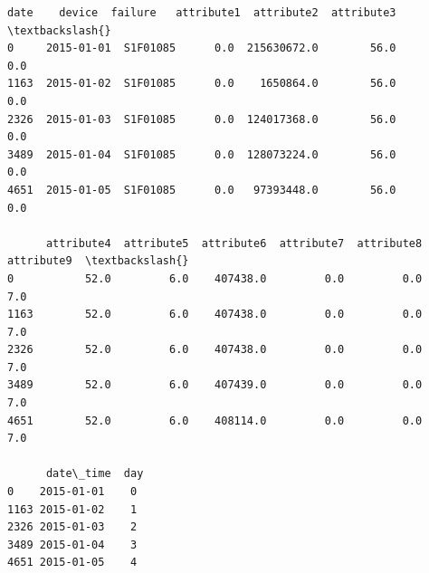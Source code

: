 \documentclass[11pt]{article}
\makeatletter
\newcommand{\boxspacing}{\kern\kvtcb@left@rule\kern\kvtcb@boxsep}
\newcommand{\prompt}[4]{
        \ttfamily\llap{{\color{#2}[#3]:\hspace{3pt}#4}}\vspace{-\baselineskip}
    }
\makeatother
\begin{document}
            \begin{tcolorbox}[breakable, size=fbox, boxrule=.5pt, pad at break*=1mm, opacityfill=0]
\prompt{Out}{outcolor}{4}{\boxspacing}
\begin{Verbatim}[commandchars=\\\{\}]
            date    device  failure   attribute1  attribute2  attribute3  \textbackslash{}
0     2015-01-01  S1F01085      0.0  215630672.0        56.0         0.0
1163  2015-01-02  S1F01085      0.0    1650864.0        56.0         0.0
2326  2015-01-03  S1F01085      0.0  124017368.0        56.0         0.0
3489  2015-01-04  S1F01085      0.0  128073224.0        56.0         0.0
4651  2015-01-05  S1F01085      0.0   97393448.0        56.0         0.0

      attribute4  attribute5  attribute6  attribute7  attribute8  attribute9  \textbackslash{}
0           52.0         6.0    407438.0         0.0         0.0         7.0
1163        52.0         6.0    407438.0         0.0         0.0         7.0
2326        52.0         6.0    407438.0         0.0         0.0         7.0
3489        52.0         6.0    407439.0         0.0         0.0         7.0
4651        52.0         6.0    408114.0         0.0         0.0         7.0

      date\_time  day
0    2015-01-01    0
1163 2015-01-02    1
2326 2015-01-03    2
3489 2015-01-04    3
4651 2015-01-05    4
\end{Verbatim}
\end{tcolorbox}
        
\end{document}
